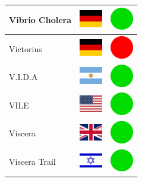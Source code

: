 \documentclass[12pt, a4paper, twoside]{report}
\begin{document}
\begin{center}
\begin{longtable}{|p{5cm}|p{2cm}|p{2cm}|}
Vibrio Cholera & \includegraphics[width=1cm]{4x3/de} & \includegraphics[width=1cm]{likes/y} \\ \hline
Victorius & \includegraphics[width=1cm]{4x3/de} & \includegraphics[width=1cm]{likes/n} \\ \hline
V.I.D.A & \includegraphics[width=1cm]{4x3/ar} & \includegraphics[width=1cm]{likes/y} \\ \hline
VILE & \includegraphics[width=1cm]{4x3/us} & \includegraphics[width=1cm]{likes/y} \\ \hline
Viscera & \includegraphics[width=1cm]{4x3/gb} & \includegraphics[width=1cm]{likes/y} \\ \hline
Viscera Trail & \includegraphics[width=1cm]{4x3/il} & \includegraphics[width=1cm]{likes/y} \\ \hline

\end{longtable}
\end{center}
\end{document}
